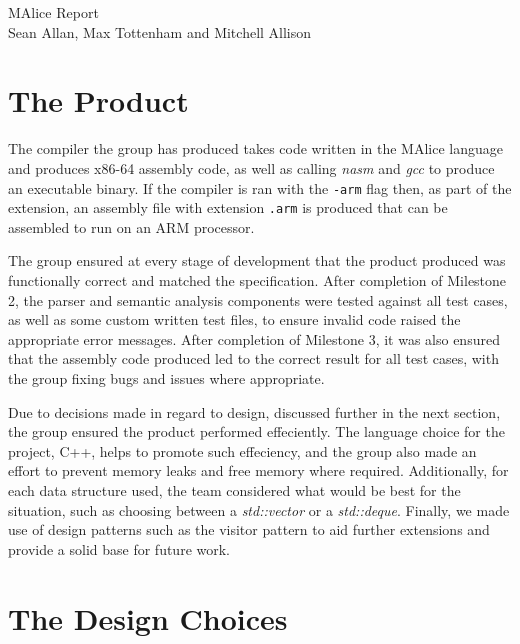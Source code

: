 \documentclass[a4wide, 11pt]{article}
\begin{document}
\begin{center}
{\huge MAlice Report} \\ [0.4cm]
{\large Sean Allan, Max Tottenham and Mitchell Allison} \\ [0.2cm]
\vspace{1cm}
\end{center}

\section{The Product}
The compiler the group has produced takes code written in the MAlice language
and produces x86-64 assembly code, as well as calling \emph{nasm} and \emph{gcc}
to produce an executable binary. If the compiler is ran with the \texttt{-arm} 
flag then, as part of the extension, an assembly file with extension 
\texttt{.arm} is produced that can be assembled to run on an ARM processor.

The group ensured at every stage of development that the product produced
was functionally correct and matched the specification. After completion of
Milestone 2, the parser and semantic analysis components were tested against
all test cases, as well as some custom written test files, to ensure invalid
code raised the appropriate error messages. After completion of Milestone 3, it
was also ensured that the assembly code produced led to the correct result 
for all test cases, with the group fixing bugs and issues where appropriate.

Due to decisions made in regard to design, discussed further in the next
section, the group ensured the product performed effeciently. The language
choice for the project, C++, helps to promote such effeciency, and the group
also made an effort to prevent memory leaks and free memory where required. 
Additionally, for each data structure used, the team considered what would be
best for the situation, such as choosing between a \emph{std::vector} or a
\emph{std::deque}. Finally, we made use of design patterns such as the visitor
pattern to aid further extensions and provide a solid base for future work.

\section{The Design Choices}
\end{document}
